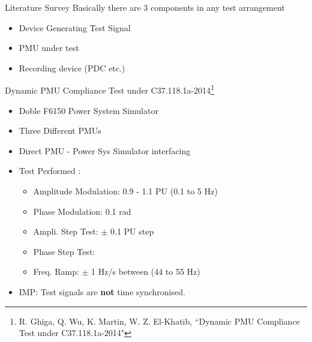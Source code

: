 \documentclass{beamer}
\begin{document}

\begin{frame}{Literature Survey}
Basically there are 3 components in any test arrangement
\begin{itemize}
\item Device Generating Test Signal
\item PMU under test
\item Recording device (PDC etc.)
\end{itemize}

\end{frame}

\begin{frame}{Dynamic PMU Compliance Test under C37.118.1a-2014\footnote{\tiny R. Ghiga, Q. Wu, K. Martin, W. Z. El-Khatib, ``Dynamic PMU Compliance
Test under C37.118.1a-2014"}}

\begin{itemize}
\item Doble F6150 Power System Simulator
\item Three Different PMUs
\item Direct PMU - Power Sys Simulator interfacing
\item Test Performed \cite{Paper:ghiga} : 

\begin{itemize}
	\item Amplitude Modulation: 0.9 - 1.1 PU (\@ 0.1 to 5 Hz)
	\item Phase Modulation: 0.1 rad
	\item Ampli. Step Test: $\pm$ 0.1 PU step
	\item Phase Step Test: 
	\item Freq. Ramp: $\pm$ 1 Hz/s between (44 to 55 Hz)
\end{itemize}
\item IMP: Test signals are \textbf{not} time synchronised.
\end{itemize}

\end{frame}
\end{document}
